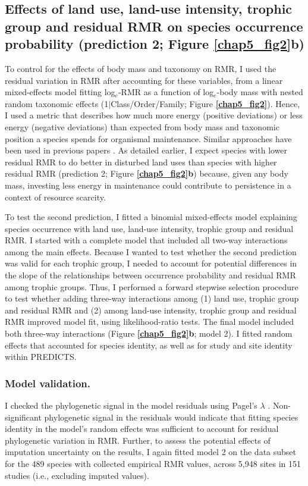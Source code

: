 \subsection{Effects of land use, land-use intensity, trophic group and residual RMR on species occurrence probability (prediction 2; Figure \ref{chap5_fig2}b)}

To control for the effects of body mass and taxonomy on RMR, I used the residual variation in RMR after accounting for these variables, from a linear mixed-effects model fitting log$_e$-RMR as a function of log$_e$-body mass with nested random taxonomic effects (1$\mid$Class/Order/Family; Figure \textbf{\ref{chap5_fig2}}). Hence, I used a metric that describes how much more energy (positive deviations) or less energy (negative deviations) than expected from body mass and taxonomic position a species spends for organismal maintenance. Similar approaches have been used in previous papers \citep{Furness2008, Naya2013}. As detailed earlier, I expect species with lower residual RMR to do better in disturbed land uses than species with higher residual RMR (prediction 2; Figure \textbf{\ref{chap5_fig2}b}) because, given any body mass, investing less energy in maintenance could contribute to persistence in a context of resource scarcity. 

To test the second prediction, I fitted a binomial mixed-effects model explaining species occurrence with land use, land-use intensity, trophic group and residual RMR. I started with a complete model that included all two-way interactions among the main effects. Because I wanted to test whether the second prediction was valid for each trophic group, I needed to account for potential differences in the slope of the relationships between occurrence probability and residual RMR among trophic groups. Thus, I performed a forward stepwise selection procedure to test whether adding three-way interactions among (1) land use, trophic group and residual RMR and (2) among land-use intensity, trophic group and residual RMR improved model fit, using likelihood-ratio tests. The final model included both three-way interactions (Figure \textbf{\ref{chap5_fig2}b}; model 2). I fitted random effects that accounted for species identity, as well as for study and site identity within PREDICTS.  

\subsubsection*{Model validation.}
I checked the phylogenetic signal in the model residuals using Pagel’s $\lambda$ \citep{Pagel1999}. Non-significant phylogenetic signal in the residuals would indicate that fitting species identity in the model’s random effects was sufficient to account for residual phylogenetic variation in RMR. Further, to assess the potential effects of imputation uncertainty on the results, I again fitted model 2 on the data subset for the 489 species with collected empirical RMR values, across 5,948 sites in 151 studies (i.e., excluding imputed values).  


